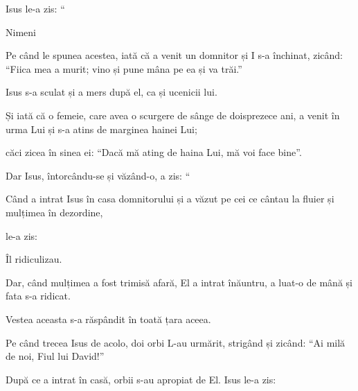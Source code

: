 {\par }{\PP {}Isus le-a zis: “{}

Nimeni
{}



\par }{\PP {}Pe când le spunea acestea, iată că a venit un domnitor și I s-a închinat, zicând: “Fiica mea a murit; vino și pune mâna pe ea și va trăi.”


\par }{\PP {}Isus s-a sculat și a mers după el, ca și ucenicii lui.

Și iată că o femeie, care avea o scurgere de sânge de doisprezece ani, a venit în urma Lui și s-a atins de marginea hainei Lui;

căci zicea în sinea ei: “Dacă mă ating de haina Lui, mă voi face bine”.


\par }{\PP {}Dar Isus, întorcându-se și văzând-o, a zis: “{}


\par }{\PP {}Când a intrat Isus în casa domnitorului și a văzut pe cei ce cântau la fluier și mulțimea în dezordine,

le-a zis:
{}

\par }{\PP Îl ridiculizau.

Dar, când mulțimea a fost trimisă afară, El a intrat înăuntru, a luat-o de mână și fata s-a ridicat.

Vestea aceasta s-a răspândit în toată țara aceea.


\par }{\PP {}Pe când trecea Isus de acolo, doi orbi L-au urmărit, strigând și zicând: “Ai milă de noi, Fiul lui David!”

După ce a intrat în casă, orbii s-au apropiat de El. Isus le-a zis:
{}

}
